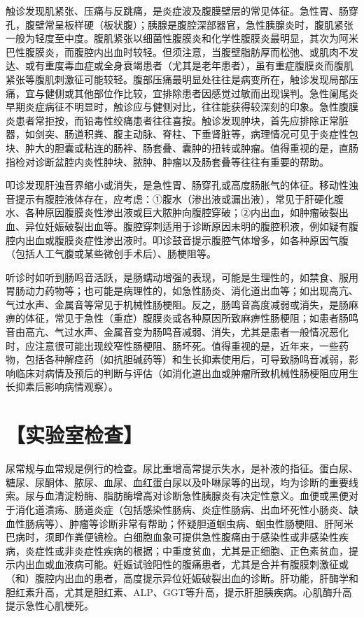 触诊发现肌紧张、压痛与反跳痛，是炎症波及腹膜壁层的常见体征。急性胃、肠穿孔，腹壁常呈板样硬（板状腹）；胰腺是腹腔深部器官，急性胰腺炎时，腹肌紧张一般为轻度至中度。腹肌紧张以细菌性腹膜炎和化学性腹膜炎最明显，其次为阿米巴性腹膜炎，而腹腔内出血时较轻。但须注意，当腹壁脂肪厚而松弛、或肌肉不发达、或有重度毒血症或全身衰竭患者（尤其是老年患者），虽有重症腹膜炎而腹肌紧张等腹肌刺激征可能较轻。腹部压痛最明显处往往是病变所在，触诊发现局部压痛，宜与健侧或其他部位作比较，宜排除患者因感觉过敏而出现误判。急性阑尾炎早期炎症病征不明显时，触诊应与健侧对比，往往能获得较深刻的印象。急性腹膜炎患者常拒按，而铅毒性绞痛患者往往喜按。触诊发现肿块，首先应排除正常脏器，如剑突、肠道积粪、腹主动脉、脊柱、下垂肾脏等，病理情况可见于炎症性包块、肿大的胆囊或粘连的肠袢、肠套叠、囊肿的扭转或肿瘤。值得重视的是，直肠指检对诊断盆腔内炎性肿块、脓肿、肿瘤以及肠套叠等往往有重要的帮助。

叩诊发现肝浊音界缩小或消失，是急性胃、肠穿孔或高度肠胀气的体征。移动性浊音提示有腹腔液体存在，应考虑：①腹水（渗出液或漏出液），常见于肝硬化腹水、各种原因腹膜炎性渗出液或巨大脓肿向腹腔穿破；②内出血，如肿瘤破裂出血、异位妊娠破裂出血等。腹腔穿刺适用于诊断原因未明的腹腔积液，例如疑有腹腔内出血或腹膜炎症性渗出液时。叩诊鼓音提示腹腔气体增多，如各种原因气腹（包括人工气腹或某些微创手术后）、肠梗阻等。

听诊时如听到肠鸣音活跃，是肠蠕动增强的表现，可能是生理性的，如禁食、服用胃肠动力药物等；也可能是病理性的，如急性肠炎、消化道出血等；如出现高亢、气过水声、金属音等常见于机械性肠梗阻。反之，肠鸣音高度减弱或消失，是肠麻痹的体征，常见于急性（重症）腹膜炎或各种原因所致麻痹性肠梗阻；如患者肠鸣音由高亢、气过水声、金属音变为肠鸣音减弱、消失，尤其是患者一般情况恶化时，应注意很可能出现绞窄性肠梗阻、肠坏死。值得重视的是，近年来，一些药物，包括各种解痉药（如抗胆碱药等）和生长抑素使用后，可导致肠鸣音减弱，影响临床对病情及预后的判断与评估（如消化道出血或肿瘤所致机械性肠梗阻应用生长抑素后影响病情观察）。

\section{【实验室检查】}

尿常规与血常规是例行的检查。尿比重增高常提示失水，是补液的指征。蛋白尿、糖尿、尿酮体、脓尿、血尿、血红蛋白尿以及卟啉尿等的出现，均为诊断的重要线索。尿与血清淀粉酶、脂肪酶增高对诊断急性胰腺炎有决定性意义。血便或黑便对于消化道溃疡、肠道炎症（包括感染性肠病、炎症性肠病、出血坏死性小肠炎、缺血性肠病等）、肿瘤等诊断非常有帮助；怀疑胆道蛔虫病、蛔虫性肠梗阻、肝阿米巴病时，须即作粪便镜检。白细胞血象可提供急性腹痛由于感染性或非感染性疾病，炎症性或非炎症性疾病的根据；中重度贫血，尤其是正细胞、正色素贫血，提示内出血或血液病可能。妊娠试验阳性的腹痛患者，尤其是合并有腹膜刺激征或（和）腹腔内出血的患者，高度提示异位妊娠破裂出血的诊断。肝功能，肝酶学和胆红素升高，尤其是胆红素、ALP、GGT等升高，提示肝胆胰疾病。心肌酶升高提示急性心肌梗死。

